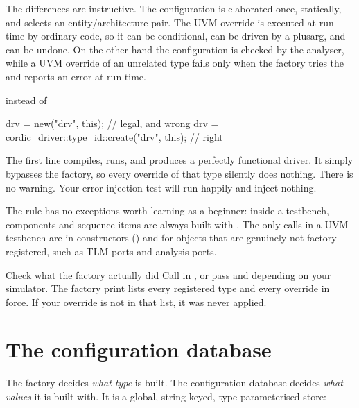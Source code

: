 The differences are instructive. The \VHDL{} configuration is elaborated
once, statically, and selects an entity/architecture pair. The UVM override
is executed at run time by ordinary code, so it can be conditional, can be
driven by a plusarg, and can be undone. On the other hand the \VHDL{}
configuration is checked by the analyser, while a UVM override of an
unrelated type fails only when the factory tries the  and
reports an error at run time.

\begin{gotcha}{ instead of }
%
\begin{uvmcode}
drv = new("drv", this);                            // legal, and wrong
drv = cordic_driver::type_id::create("drv", this); // right
\end{uvmcode}

The first line compiles, runs, and produces a perfectly functional driver.
It simply bypasses the factory, so every override of that type silently does
nothing. There is no warning. Your error-injection test will run happily and
inject nothing.

The rule has no exceptions worth learning as a beginner: inside a testbench,
components and sequence items are always built with
. The only  calls in a UVM testbench are in
constructors () and for objects that are
genuinely not factory-registered, such as TLM ports and analysis ports.
\end{gotcha}

\begin{tipbox}{Check what the factory actually did}
Call  in
, or pass 
and  depending on your simulator. The factory print lists
every registered type and every override in force. If your override is not in
that list, it was never applied.
\end{tipbox}

\section{The configuration database}
\label{sec:uvm:configdb}

%
The factory decides \emph{what type} is built. The configuration database
decides \emph{what values} it is built with. It is a global, string-keyed,
type-parameterised store:

